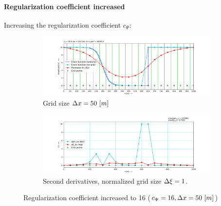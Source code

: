 \paragraph*{Regularization coefficient increased}
Increasing the regularization coefficient $c_\Psi$:
\begin{figure}[H]
    \centering
    \begin{subfigure}[t]{0.49\textwidth}
        \includegraphics[width=1.0\textwidth]{figures/regul_1_1d_scalar_dx50.0_cpsi16.0.pdf}
        \caption{Grid size $\Dx = 50\ [m]$}
    \end{subfigure}
    \hfill
    \begin{subfigure}[t]{0.49\textwidth}
        \centering
        \includegraphics[width=1.0\textwidth]{figures/regul_2_1d_scalar_dx50.0_cpsi16.0.pdf}
        \caption{Second derivatives, normalized grid size $\Delta \xi = 1$.}
    \end{subfigure}
    \caption{Regularization coefficient increased to 16 ($c_\Psi = 16, \Delta x = 50\ [m]$)}
\end{figure}
